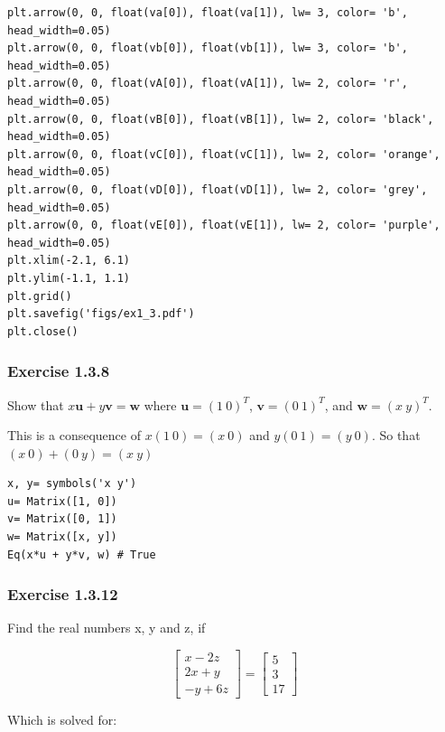 \begin{verbatim}
plt.arrow(0, 0, float(va[0]), float(va[1]), lw= 3, color= 'b', head_width=0.05)
plt.arrow(0, 0, float(vb[0]), float(vb[1]), lw= 3, color= 'b', head_width=0.05)
plt.arrow(0, 0, float(vA[0]), float(vA[1]), lw= 2, color= 'r', head_width=0.05)
plt.arrow(0, 0, float(vB[0]), float(vB[1]), lw= 2, color= 'black', head_width=0.05)
plt.arrow(0, 0, float(vC[0]), float(vC[1]), lw= 2, color= 'orange', head_width=0.05)
plt.arrow(0, 0, float(vD[0]), float(vD[1]), lw= 2, color= 'grey', head_width=0.05)
plt.arrow(0, 0, float(vE[0]), float(vE[1]), lw= 2, color= 'purple', head_width=0.05)
plt.xlim(-2.1, 6.1)
plt.ylim(-1.1, 1.1)
plt.grid()
plt.savefig('figs/ex1_3.pdf')
plt.close()
\end{verbatim}

\subsubsection{Exercise 1.3.8}
Show that $x\mathbf{u} + y\mathbf{v} = \mathbf{w}$ where
$\mathbf{u}= (1\ 0)^{T}$, $\mathbf{v}= (0\ 1)^{T}$, and $\mathbf{w}= (x\ y)^{T}$.

This is a consequence of $x(1\ 0) = (x\ 0)$ and $y(0\ 1) = (y\ 0)$. So that
$(x\ 0) + (0\ y) = (x\ y)$

\begin{verbatim}
x, y= symbols('x y')
u= Matrix([1, 0])
v= Matrix([0, 1])
w= Matrix([x, y])
Eq(x*u + y*v, w) # True
\end{verbatim}

\subsubsection{Exercise 1.3.12}

Find the real numbers x, y and z, if

\begin{equation}
\left[\begin{matrix}x - 2 z\\2 x + y\\- y + 6 z\end{matrix}\right] = \left[\begin{matrix}5\\3\\17\end{matrix}\right]
\end{equation}

Which is solved for:

